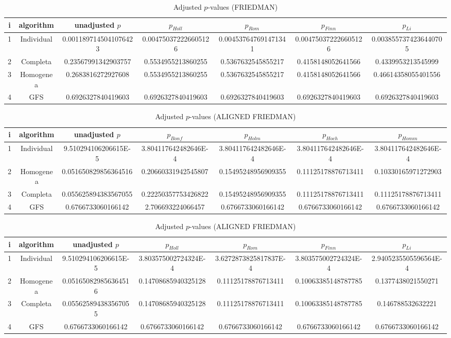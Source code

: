 \documentclass[a4paper,10pt]{article}
\begin{document}
\begin{landscape}
\begin{table}[!htp]
\centering\scriptsize
\caption{Adjusted $p$-values (FRIEDMAN)}
\begin{tabular}{ccccccc}
i&algorithm&unadjusted $p$&$p_{Holl}$&$p_{Rom}$&$p_{Finn}$&$p_{Li}$\\
\hline
1&Individual&0.0011897145041076423&0.004750372226605126&0.004537647691471341&0.004750372226605126&0.0038557374236440705\\
2&Completa&0.23567991342903757&0.5534955213860255&0.5367632545855217&0.4158148052641566&0.4339953213545999\\
3&Homogenea&0.2683816272927608&0.5534955213860255&0.5367632545855217&0.4158148052641566&0.46614358055401556\\
4&GFS&0.6926327840419603&0.6926327840419603&0.6926327840419603&0.6926327840419603&0.6926327840419603\\
\hline
\end{tabular}
\end{table}


\newpage

\begin{table}[!htp]
\centering\scriptsize
\caption{Adjusted $p$-values (ALIGNED FRIEDMAN)}
\begin{tabular}{ccccccc}
i&algorithm&unadjusted $p$&$p_{Bonf}$&$p_{Holm}$&$p_{Hoch}$&$p_{Homm}$\\
\hline
1&Individual&9.510294106206615E-5&3.804117642482646E-4&3.804117642482646E-4&3.804117642482646E-4&3.804117642482646E-4\\
2&Homogenea&0.051650829856364516&0.20660331942545807&0.15495248956909355&0.11125178876713411&0.10330165971272903\\
3&Completa&0.055625894383567055&0.22250357753426822&0.15495248956909355&0.11125178876713411&0.11125178876713411\\
4&GFS&0.6766733060166142&2.706693224066457&0.6766733060166142&0.6766733060166142&0.6766733060166142\\
\hline
\end{tabular}
\end{table}

\begin{table}[!htp]
\centering\scriptsize
\caption{Adjusted $p$-values (ALIGNED FRIEDMAN)}
\begin{tabular}{ccccccc}
i&algorithm&unadjusted $p$&$p_{Holl}$&$p_{Rom}$&$p_{Finn}$&$p_{Li}$\\
\hline
1&Individual&9.510294106206615E-5&3.803575002724324E-4&3.6272873825817837E-4&3.803575002724324E-4&2.9405235505596564E-4\\
2&Homogenea&0.051650829856364516&0.14708685940325128&0.11125178876713411&0.10063385148787785&0.1377438021550271\\
3&Completa&0.055625894383567055&0.14708685940325128&0.11125178876713411&0.10063385148787785&0.146788532632221\\
4&GFS&0.6766733060166142&0.6766733060166142&0.6766733060166142&0.6766733060166142&0.6766733060166142\\
\hline
\end{tabular}
\end{table}



\end{landscape}
\end{document}
